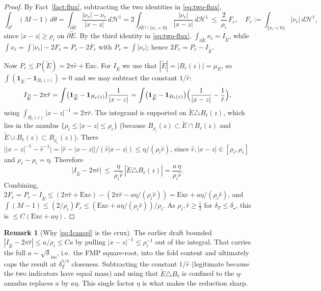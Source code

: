 \documentclass[11pt]{article}
\theoremstyle{definition}
\newtheorem{remark}[theorem]{Remark}
\newcommand{\HH}{\mathcal H}
\newcommand{\dT}{\delta_T}
\newcommand{\diso}{\delta_{\mathrm{iso}}}
\newcommand{\Etil}{\widetilde E}
\newcommand{\Exc}{\mathrm{Exc}}
\newcommand{\abs}[1]{\left|#1\right|}
\begin{document}
\begin{proof}
By Fact~\ref{fact:flux}, subtracting the two identities in
\eqref{eq:two-flux},
\[
   \int_{S^1}\!(M-1)\,d\theta
   =\int_{\partial\Etil}\frac{\abs{\nu_r}-\nu_r}{\abs{x-z}}\,d\HH^1
   =2\!\int_{\partial\Etil\cap\{\nu_r<0\}}\!\frac{\abs{\nu_r}}{\abs{x-z}}\,d\HH^1
   \ \le\ \frac{2}{\rho_i}\,F_r,\quad
   F_r:=\!\int_{\{\nu_r<0\}}\!\abs{\nu_r}\,d\HH^1,
\]
since $\abs{x-z}\ge\rho_i$ on $\partial\Etil$. By the third identity in
\eqref{eq:two-flux}, $\int_{\partial\Etil}\nu_r=I_{\Etil}$, while
$\int\nu_r=\int\abs{\nu_r}-2F_r=P_r-2F_r$ with $P_r=\int\abs{\nu_r}$; hence
$2F_r=P_r-I_{\Etil}$.

Now $P_r\le P(\Etil)=2\pi\hat r+\Exc$. For $I_{\Etil}$ we use that
$\abs\Etil=\abs{B_{\hat r}(z)}=\mu_E$, so
$\int(\mathbf1_{\Etil}-\mathbf1_{B_{\hat r}(z)})=0$ and we may subtract the
constant $1/\hat r$:
\[
   I_{\Etil}-2\pi\hat r
   =\int\bigl(\mathbf1_{\Etil}-\mathbf1_{B_{\hat r}(z)}\bigr)
       \frac{1}{\abs{x-z}}
   =\int\bigl(\mathbf1_{\Etil}-\mathbf1_{B_{\hat r}(z)}\bigr)
       \Bigl(\frac{1}{\abs{x-z}}-\frac1{\hat r}\Bigr),
\]
using $\int_{B_{\hat r}(z)}\abs{x-z}^{-1}=2\pi\hat r$. The integrand is
supported on $\Etil\triangle B_{\hat r}(z)$, which lies in the annulus
$\{\rho_i\le\abs{x-z}\le\rho_e\}$ (because $B_{\rho_i}(z)\subset\Etil\cap
B_{\hat r}(z)$ and $\Etil\cup B_{\hat r}(z)\subset B_{\rho_e}(z)$). There
$\bigl|\abs{x-z}^{-1}-\hat r^{-1}\bigr|=\bigl|\hat r-\abs{x-z}\bigr|/
(\hat r\abs{x-z})\le\eta/(\rho_i\hat r)$, since $\hat r,\abs{x-z}\in
[\rho_i,\rho_e]$ and $\rho_e-\rho_i=\eta$. Therefore
\begin{equation}\label{eq:Icancel}
   \bigl|I_{\Etil}-2\pi\hat r\bigr|\ \le\ \frac{\eta}{\rho_i\hat r}\,
   \abs{\Etil\triangle B_{\hat r}(z)}=\frac{a\,\eta}{\rho_i\hat r}.
\end{equation}
Combining, $2F_r=P_r-I_{\Etil}\le(2\pi\hat r+\Exc)-(2\pi\hat r-a\eta/(\rho_i
\hat r))=\Exc+a\eta/(\rho_i\hat r)$, and
$\int(M-1)\le(2/\rho_i)F_r\le(\Exc+a\eta/(\rho_i\hat r))/\rho_i$. As
$\rho_i,\hat r\ge\tfrac12$ for $\dT\le\delta_\star$, this is
$\le C(\Exc+a\eta)$.
\end{proof}

\begin{remark}[Why \eqref{eq:Icancel} is the crux]
The earlier draft bounded $\abs{I_{\Etil}-2\pi\hat r}\le a/\rho_i\le Ca$ by
pulling $\abs{x-z}^{-1}\le\rho_i^{-1}$ out of the integral. That carries the
full $a\sim\sqrt\diso$, i.e.\ the FMP square-root, into the fold content and
ultimately caps the result at $\dT^{1/4}$ closeness. Subtracting the
constant $1/\hat r$ (legitimate because the two indicators have equal mass)
and using that $\Etil\triangle B_{\hat r}$ is confined to the
$\eta$-annulus replaces $a$ by $a\eta$. This single factor $\eta$ is what
makes the reduction sharp.
\end{remark}
\end{document}
